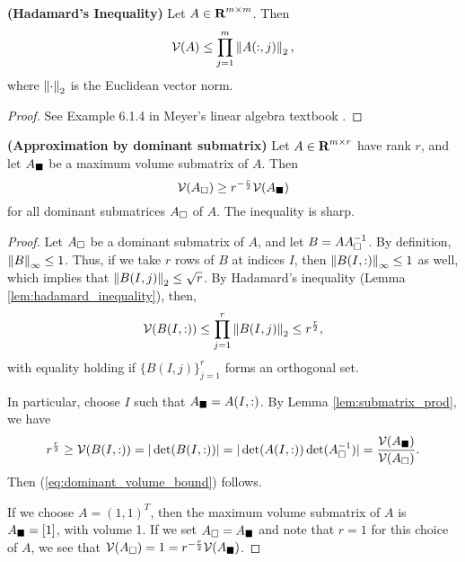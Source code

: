 \documentclass{article}
\begin{document}
	\begin{lem} \textnormal{\bf(Hadamard's Inequality)}
		\label{lem:hadamard_inequality}
		Let $A \in \textnormal{\bf R}^{m\times m}$. Then
		\begin{equation}
			\label{eq:hadamard_inequality}
			\mathcal{V}(A) \le \prod_{j=1}^m\left\lVert A(:, j) \right\rVert_2,
		\end{equation}
		where $\left\lVert \cdot \right\rVert_2$ is the Euclidean vector norm.
	\end{lem}
	\begin{proof}
		See Example 6.1.4 in Meyer's linear algebra textbook \cite{meyer_2008}.
	\end{proof}
	
	\begin{thm} \textnormal{\bf(Approximation by dominant submatrix)}
		\label{thm:dominant_volume_bound}
		Let $A \in \textnormal{\bf R}^{m\times r}$ have rank $r$, and let $A_\blacksquare$ be a maximum volume submatrix of $A$. Then
		\begin{equation}
			\label{eq:dominant_volume_bound}
			\mathcal{V}(A_\square) \ge r^{-\frac{r}{2}}\mathcal{V}(A_\blacksquare)
		\end{equation}
		for all dominant submatrices $A_\square$ of $A$. The inequality is sharp.
	\end{thm}
	
	\begin{proof}
		Let $A_\square$ be a dominant submatrix of $A$, and let $B = AA_\square^{-1}$. By definition, $\left\lVert B \right\rVert_\infty \le 1$. Thus, if we take $r$ rows of $B$ at indices $I$, then $\left\lVert B(I,:) \right\rVert_\infty\le 1$ as well, which implies that $\left\lVert B(I,j) \right\rVert_2 \le \sqrt{r}$. By Hadamard's inequality (Lemma \ref{lem:hadamard_inequality}), then,
		\begin{equation}
			\mathcal{V}(B(I,:)) \le \prod_{j=1}^r \left\lVert B(I,j) \right\rVert_2 \le r^\frac{r}{2},
		\end{equation}
		with equality holding if $\{B(I,j)\}_{j=1}^r$ forms an orthogonal set.
		
		In particular, choose $I$ such that $A_\blacksquare = A(I,:)$. By Lemma \ref{lem:submatrix_prod}, we have 
		\begin{equation}
			r^{\frac{r}{2}} \ge \mathcal{V}(B(I,:)) = |\det(B(I,:))| = |\det(A(I,:))\det(A_\square^{-1})| = \frac{\mathcal{V}(A_\blacksquare)}{\mathcal{V}(A_\square)}.
		\end{equation}
		Then (\ref{eq:dominant_volume_bound}) follows.
		
		If we choose $A = (1, 1)^T$, then the maximum volume submatrix of $A$ is $A_\blacksquare = [1]$, with volume 1. If we set $A_\square = A_\blacksquare$ and note that $r=1$ for this choice of $A$, we see that $\mathcal{V}(A_\square) = 1 = r^{-\frac{r}{2}}\mathcal{V}(A_\blacksquare)$.
	\end{proof}
	
\end{document}
